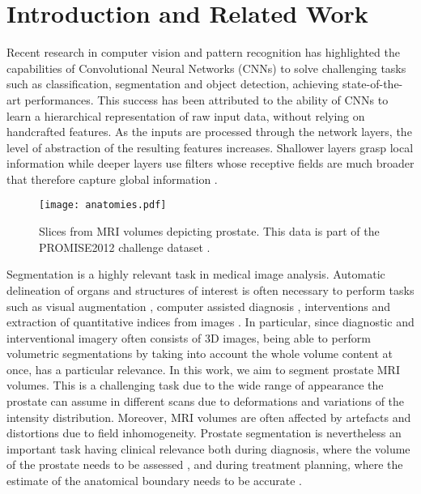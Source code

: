 \documentclass{llncs}
\begin{document}
\section{Introduction and Related Work}
\label{sec:intro}
Recent research in computer vision and pattern recognition has highlighted the capabilities of Convolutional Neural Networks (CNNs) to solve challenging tasks such as classification, segmentation and object detection, achieving state-of-the-art performances. 
This success has been attributed to the ability of CNNs to learn a hierarchical representation of raw input data, without relying on handcrafted features. 
As the inputs are processed through the network layers, the level of abstraction of the resulting features increases. 
Shallower layers grasp local information while deeper layers use filters whose receptive fields are much broader that therefore capture global information \cite{zeiler2014visualizing}. 

\begin{figure} 	
\centering 	
\texttt{[image: anatomies.pdf]} 	
\caption{Slices from MRI volumes depicting prostate. This data is part of the PROMISE2012 challenge dataset \cite{litjens2014evaluation}.} \label{fig:anatomies} 
\end{figure}

Segmentation is a highly relevant task in medical image analysis. 
Automatic delineation of organs and structures of interest is often necessary to perform tasks such as visual augmentation \cite{moradi2009augmenting}, computer assisted diagnosis \cite{porter2003combining}, interventions \cite{zettinig2015multimodal} and extraction of quantitative indices from images \cite{bernard2015standardized}. 
In particular, since diagnostic and interventional imagery often consists of 3D images, being able to perform volumetric segmentations by taking into account the whole volume content at once, has a particular relevance. 
In this work, we aim to segment prostate MRI volumes. This is a challenging task due to the wide range of appearance the prostate can assume in different scans due to deformations and variations of the intensity distribution. Moreover, MRI volumes are often affected by artefacts and distortions due to field inhomogeneity. Prostate segmentation is nevertheless an important task having clinical relevance both during diagnosis, where the volume of the prostate needs to be assessed \cite{roehrborn1999serum}, and during treatment planning, where the estimate of the anatomical boundary needs to be accurate \cite{huyskens2009qualitative,zettinig2015multimodal}. 
\end{document}
